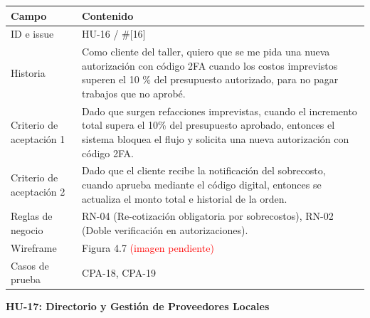 {\def\LTcaptype{none} %
\begin{longtable}[]{@{}
  >{\raggedright\arraybackslash}p{}
  >{\raggedright\arraybackslash}p{}@{}}
\toprule\noalign{}
\begin{minipage}[b]{\linewidth}\raggedright
\textbf{Campo}
\end{minipage} & \begin{minipage}[b]{\linewidth}\raggedright
\textbf{Contenido}
\end{minipage} \\
\midrule\noalign{}
\endhead
\bottomrule\noalign{}
\endlastfoot
ID e issue & HU-16 / \#{[}16{]} \\
Historia & Como cliente del taller, quiero que se me pida una nueva
autorización con código 2FA cuando los costos imprevistos superen el 10
\% del presupuesto autorizado, para no pagar trabajos que no aprobé. \\
Criterio de aceptación 1 & Dado que surgen refacciones imprevistas,
cuando el incremento total supera el 10\% del presupuesto aprobado,
entonces el sistema bloquea el flujo y solicita una nueva autorización
con código 2FA. \\
Criterio de aceptación 2 & Dado que el cliente recibe la notificación
del sobrecosto, cuando aprueba mediante el código digital, entonces se
actualiza el monto total e historial de la orden. \\
Reglas de negocio & RN-04 (Re-cotización obligatoria por sobrecostos),
RN-02 (Doble verificación en autorizaciones). \\
Wireframe & Figura 4.7 \textcolor{red}{(imagen pendiente)} \\
Casos de prueba & CPA-18, CPA-19 \\
\end{longtable}
}

\textbf{HU-17: Directorio y Gestión de Proveedores Locales}

